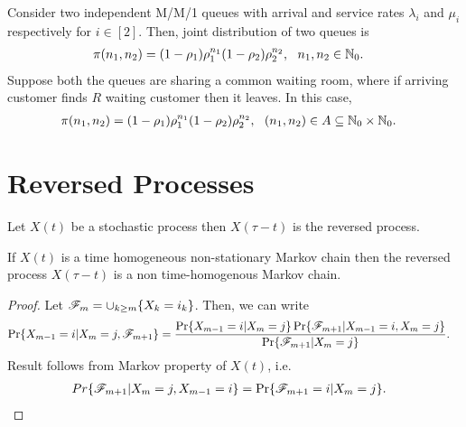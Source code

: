 \documentclass[a4paper,10pt,english]{article}
\begin{document}
\begin{shaded*}
\begin{exmp*} Consider two independent M/M/1 queues with arrival and service rates $\lambda_i$ and $\mu_i$ respectively for $i \in [2]$. Then, joint distribution of two queues is
\begin{align*}
\pi(n_1,n_2) &= (1 -\rho_1)\rho_1^{n_1}(1-\rho_2)\rho_2^{n_2},~~n_1,n_2 \in \mathbb{N}_0. 
\end{align*}
Suppose both the queues are sharing a common waiting room, where if arriving customer finds $R$ waiting customer then it leaves. In this case,
\begin{align*}
\pi(n_1,n_2) &= (1 -\rho_1)\rho_1^{n_1}(1-\rho_2)\rho_2^{n_2},~~(n_1,n_2) \in A \subseteq \mathbb{N}_0\times\mathbb{N}_0. 
\end{align*}
\end{exmp*}
\end{shaded*}



\section{Reversed Processes}
\begin{defn} Let $X(t)$ be a stochastic process then $X(\tau-t)$ is the reversed process.
\end{defn}
\begin{lem} If $X(t)$ is a time homogeneous non-stationary Markov chain then the reversed process $X(\tau -t)$ is a non time-homogenous Markov chain.
\end{lem}
\begin{proof} Let $\mathscr{F}_m = \cup_{k \geq m}\{X_k = i_k\}$. Then, we can write
\begin{align*}
\Pr\{X_{m-1}=i|X_m=j,\F_{m+1}\} %
&=\frac{\Pr\{X_{m-1}=i|X_m=j\}\Pr\{\F_{m+1} |X_{m-1}=i,X_m=j \}}{\Pr\{\F_{m+1} |X_m=j\}}.
\end{align*}
Result follows from Markov property of $X(t)$, i.e.
\begin{align*}
Pr\{\mathscr{F}_{m+1} |X_m= j, X_{m-1} = i \} &=\Pr\{\mathscr{F}_{m+1}=i|X_m=j\}.
\end{align*}
\end{proof}
\end{document}
